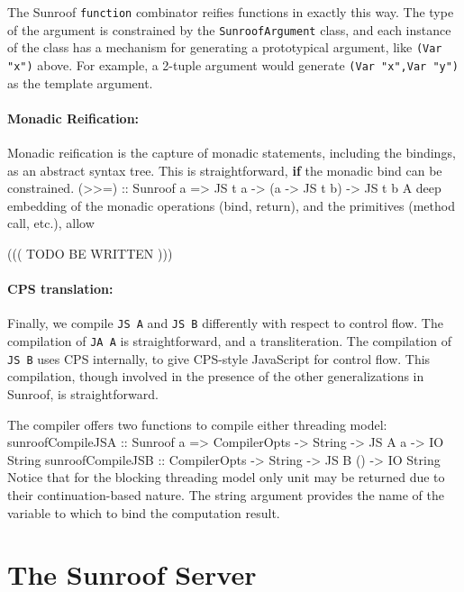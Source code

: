 \documentclass{llncs}
\newcommand{\Src}[1]{{\tt{#1}}}
\newenvironment{Code}{\verbatim}{\endverbatim}
\begin{document}
The Sunroof \Src{function} combinator reifies functions in exactly this way.
The type of the argument is constrained by the \Src{SunroofArgument} class,
and each instance of the class has a mechanism for generating a prototypical
argument, like \Src{(Var "x")} above. For example, a 2-tuple argument
would generate \Src{(Var "x",Var "y")} as the template argument.

\paragraph{Monadic Reification:}

Monadic reification is the capture of monadic statements, including the bindings,
as an abstract syntax tree. This is straightforward, {\bf if\/} the monadic bind
can be constrained.
\begin{Code}
(>>=) :: Sunroof a => JS t a -> (a -> JS t b) -> JS t b
\end{Code}
A deep embedding of the monadic operations (bind, return), and the primitives
(method call, etc.), allow 

((( TODO BE WRITTEN )))

\paragraph{CPS translation:}

Finally, we compile \Src{JS A} and \Src{JS B} differently with respect to control flow.
The compilation of \Src{JA A} is straightforward, and a transliteration.
The compilation of \Src{JS B} uses CPS internally, to give CPS-style JavaScript for
control flow. This compilation, though involved in the presence of the other
generalizations in Sunroof, is straightforward.

The compiler offers two functions to compile either threading 
model:
\begin{Code}
sunroofCompileJSA :: Sunroof a 
                  => CompilerOpts -> String -> JS A a  -> IO String
sunroofCompileJSB :: CompilerOpts -> String -> JS B () -> IO String
\end{Code}
Notice that for the blocking threading model only unit
may be returned due to their continuation-based nature. 
The string argument provides the name of the variable to which to
bind the computation result.

\section{The Sunroof Server}
\label{sec:server}
\end{document}
